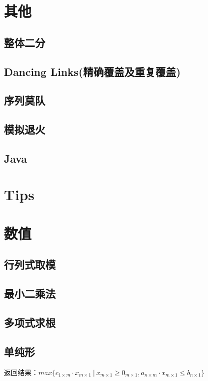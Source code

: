 \documentclass[landscape,a4paper]{article}
\begin{document}
\begin{spacing}{0.3}
\begin{multicols}{2}
		
		
		
	\section{其他}
		\subsection{整体二分}
		
		\subsection{Dancing Links(精确覆盖及重复覆盖)}
		
		\subsection{序列莫队}
		
		\subsection{模拟退火}
		
		\subsection{Java}
		

	\section{Tips}
		
	

	\section{数值}
	\subsection{行列式取模}
	
	\subsection{最小二乘法}
	
	\subsection{多项式求根}
	
	\subsection{单纯形}
	返回结果：$max\{c_{1 \times m} \cdot x_{m \times 1} \ | \ x_{m \times 1} \geq 0_{m \times 1}, a_{n \times m} \cdot x_{m \times 1} \leq b_{n \times 1}\}$


\end{multicols}
\end{spacing}
\end{document}
